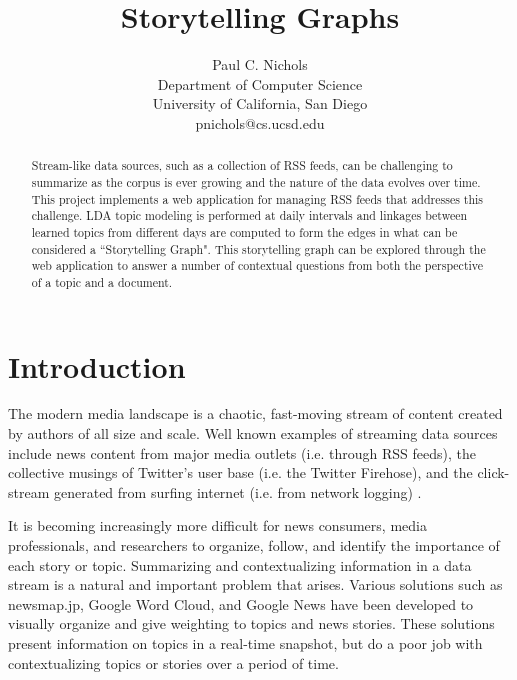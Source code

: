 \documentclass[10pt]{article}
\begin{document}
\newcommand{\argmin}{\operatornamewithlimits{argmin}}
\title{Storytelling Graphs}
\author{
    Paul C. Nichols\\
    Department of Computer Science\\
    University of California, San Diego\\
    pnichols@cs.ucsd.edu
}
\date{}
\maketitle


\begin{abstract}
Stream-like data sources, such as a collection of RSS feeds, can be challenging to summarize as the corpus is ever growing and the nature of the data evolves over time.  This project implements a web application for managing RSS feeds that addresses this challenge.  LDA topic modeling is performed at daily intervals and linkages between learned topics from different days are computed to form the edges in what can be considered a ``Storytelling Graph".  This storytelling graph can be explored through the web application  to answer a number of contextual questions from both the perspective of a topic and a document.  
\end{abstract}

\section{Introduction}
The modern media landscape is a chaotic, fast-moving stream of content created by authors of all size and scale. Well known examples of streaming data sources include news content from major media outlets (i.e. through RSS feeds), the collective musings of Twitter's user base  (i.e. the Twitter Firehose), and the click-stream generated from surfing internet (i.e. from network logging) .

It is becoming increasingly more difficult for news consumers, media professionals, and researchers to organize, follow, and identify the importance of each story or topic. Summarizing and contextualizing information in a data stream is a natural and important problem that arises. Various solutions such as newsmap.jp, Google Word Cloud, and Google News have been developed to visually organize and give weighting to topics and news stories. These solutions present information on topics in a real-time snapshot, but do a poor job with contextualizing topics or stories over a period of time. 
\end{document}
